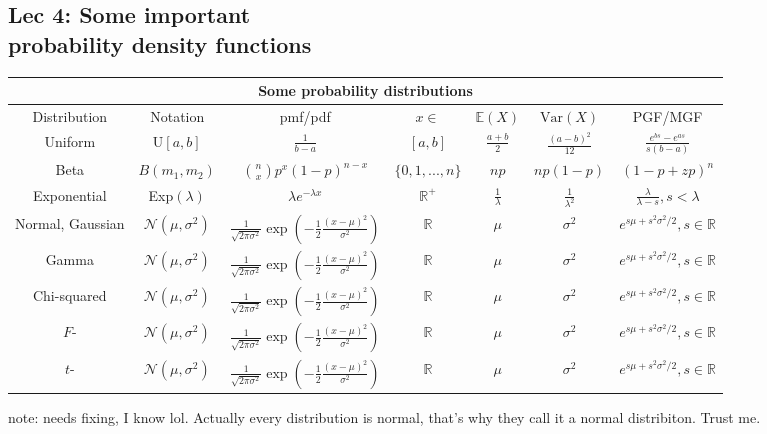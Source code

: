 \begin{landscape}

\chapter[Lec 4: Some important probability density functions]{Lec 4: Some important \\probability density functions}

\begin{tabular}{ |c|c||c|c|c|c|c|  }
    \hline
    \multicolumn{7}{|c|}{Some probability distributions} \\
    \hline
    Distribution & Notation & pmf/pdf & \(x\in\) & \(\mathbb{E}(X)\)& \(\text{Var}(X)\) & PGF/MGF\\
    \hline
    Uniform & U\([a,b]\) & \(\frac{1}{b-a}\) & \([a,b]\) & \(\frac{a+b}{2}\) & \(\frac{{\left(a-b\right)}^2}{12}\) & \(\frac{e^{bs}-e^{as}}{s(b-a)}\)\\
    Beta & \(B(m_1,m_2)\)  & \(\binom{n}{x} p^x(1-p)^{n-x}\) & \(\{0,1, ..., n\}\) & \(np\) & \(np(1-p)\) & \((1 - p + zp)^n\)\\
    Exponential & Exp\((\lambda)\) & \(\lambda e^{-\lambda x}\) & \(\mathbb{R}^+\) & \(\frac{1}{\lambda}\)& \(\frac{1}{\lambda^2}\) & \(\frac{\lambda}{\lambda - s}, s<\lambda\)\\
    Normal, Gaussian & \(\mathcal{N}(\mu,\sigma^2)\) & \(\frac{1}{\sqrt{2\pi\sigma^2}}\exp\left(-\frac{1}{2}\frac{{(x-\mu)}^2}{\sigma^2}\right)\) & \(\mathbb{R}\) & \(\mu\)& \(\sigma^2\) & \(e^{s\mu+s^2\sigma^2/2}, s\in\mathbb{R}\)\\
    Gamma & \(\mathcal{N}(\mu,\sigma^2)\) & \(\frac{1}{\sqrt{2\pi\sigma^2}}\exp\left(-\frac{1}{2}\frac{(x-\mu)^2}{\sigma^2}\right)\) & \(\mathbb{R}\) & \(\mu\)& \(\sigma^2\) & \(e^{s\mu+s^2\sigma^2/2}, s\in\mathbb{R}\)\\
    Chi-squared & \(\mathcal{N}(\mu,\sigma^2)\) & \(\frac{1}{\sqrt{2\pi\sigma^2}}\exp\left(-\frac{1}{2}\frac{(x-\mu)^2}{\sigma^2}\right)\) & \(\mathbb{R}\) & \(\mu\)& \(\sigma^2\) & \(e^{s\mu+s^2\sigma^2/2}, s\in\mathbb{R}\)\\
    \(F\)- & \(\mathcal{N}(\mu,\sigma^2)\) & \(\frac{1}{\sqrt{2\pi\sigma^2}}\exp\left(-\frac{1}{2}\frac{(x-\mu)^2}{\sigma^2}\right)\) & \(\mathbb{R}\) & \(\mu\)& \(\sigma^2\) & \(e^{s\mu+s^2\sigma^2/2}, s\in\mathbb{R}\)\\
    \(t\)- & \(\mathcal{N}(\mu,\sigma^2)\) & \(\frac{1}{\sqrt{2\pi\sigma^2}}\exp\left(-\frac{1}{2}\frac{(x-\mu)^2}{\sigma^2}\right)\) & \(\mathbb{R}\) & \(\mu\)& \(\sigma^2\) & \(e^{s\mu+s^2\sigma^2/2}, s\in\mathbb{R}\)\\
    \hline
\end{tabular}

note: needs fixing, I know lol. Actually every distribution is normal, that's why they call it a normal distribiton. Trust me.

\end{landscape}